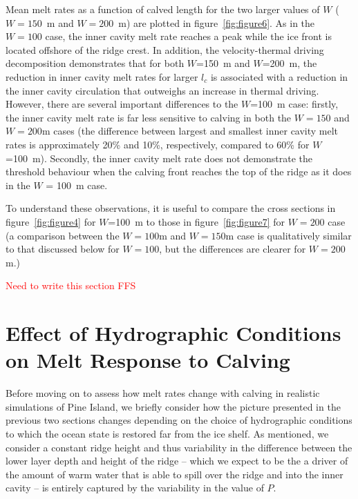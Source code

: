 \documentclass[draft]{agujournal2019}
\newcommand{\red}[1]{\textcolor{red}{#1}}
\begin{document}
Mean melt rates as a function of calved length for the two larger values of $W$ ($W = 150$~m and $W = 200$~m) are plotted in figure~\ref{fig:figure6}. As in the $W = 100$ case, the inner cavity melt rate reaches a peak while the ice front is located offshore of the ridge crest. In addition, the velocity-thermal driving decomposition demonstrates that for both $W$=150~m and $W$=200~m, the reduction in inner cavity melt rates for larger $l_c$ is associated with a reduction in the inner cavity circulation that outweighs an increase in thermal driving. However, there are several important differences to the $W$=100~m case: firstly, the inner cavity melt rate is far less sensitive to calving in both the $W = 150$ and $W = 200$m cases (the difference between largest and smallest inner cavity melt rates is approximately 20\% and 10\%, respectively, compared to 60\% for $W$=100~m). Secondly, the inner cavity melt rate does not demonstrate the threshold behaviour when the calving front reaches the top of the ridge as it does in the $W$ = 100~m case.

To understand these observations, it is useful to compare the cross sections in figure~\ref{fig:figure4} for $W$=100~m to those in figure~\ref{fig:figure7} for $W = 200$ case (a comparison between the $W = 100$m and $W = 150$m case is qualitatively similar to that discussed below for $W = 100$, but the differences are clearer for $W = 200$m.)

\red{Need to write this section FFS}
%


\section{Effect of Hydrographic Conditions on Melt Response to Calving}\label{S:Results:P}
Before moving on to assess how melt rates change with calving in realistic simulations of Pine Island, we briefly consider how the picture presented in the previous two sections changes depending on the choice of hydrographic conditions to which the ocean state is restored far from the ice shelf. As mentioned, we consider a constant ridge height and thus variability in the difference between the lower layer depth and height of the ridge -- which we expect to be the a driver of the amount of warm water that is able to spill over the ridge and into the inner cavity -- is entirely captured by the variability in the value of $P$.
\end{document}
